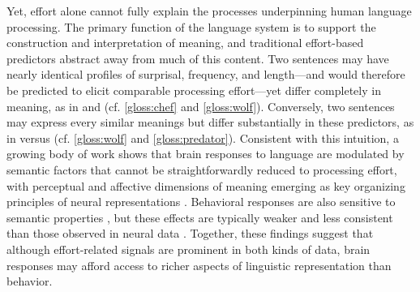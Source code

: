 \documentclass[11pt]{article}
\begin{document}
Yet, effort alone cannot fully explain the processes underpinning human language processing. The primary function of the language system is to support the construction and interpretation of meaning, and traditional effort-based predictors abstract away from much of this content. Two sentences may have nearly identical profiles of surprisal, frequency, and length---and would therefore be predicted to elicit comparable processing effort---yet differ completely in meaning, as in  and  (cf. \ref{gloss:chef} and \ref{gloss:wolf}). Conversely, two sentences may express every similar meanings but differ substantially in these predictors, as in  versus  (cf. \ref{gloss:wolf} and \ref{gloss:predator}). Consistent with this intuition, a growing body of work shows that brain responses to language are modulated by semantic factors that cannot be straightforwardly reduced to processing effort, with perceptual and affective dimensions of meaning emerging as key organizing principles of neural representations \citep{huth2016natural, deniz2019representation, tuckute2023driving, tuckute2025two}. Behavioral responses are also sensitive to semantic properties \citep{juhasz2003investigating, arfe2023effects, yao2024emotion}, but these effects are typically weaker and less consistent than those observed in neural data \citep{magnabosco2024eye}. Together, these findings suggest that although effort-related signals are prominent in both kinds of data, brain responses may afford access to richer aspects of linguistic representation than behavior.



\smallskip
\end{document}
